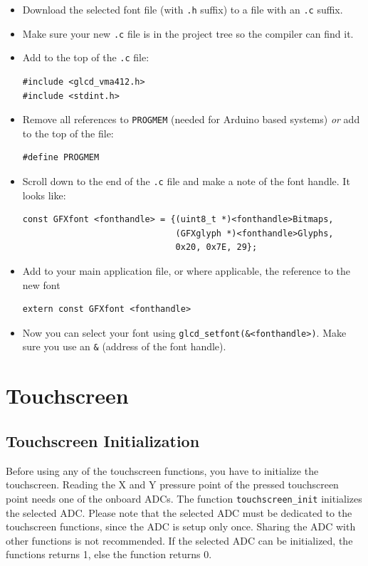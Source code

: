 \documentclass[12pt]{article}
\begin{document}
\begin{itemize}
\item Download the selected font file (with \lstinline|.h| suffix) to a file with an \lstinline|.c| suffix.
\item Make sure your new \lstinline|.c| file is in the project tree so the compiler can find it.
\item Add to the top of the \lstinline|.c| file:
\begin{lstlisting}
#include <glcd_vma412.h>
#include <stdint.h>
\end{lstlisting}
\item Remove all references to \lstinline|PROGMEM| (needed for Arduino based systems) \textsl{or} add to the top of the file:
\begin{lstlisting}
#define PROGMEM
\end{lstlisting}
\item Scroll down to the end of the \lstinline|.c| file and make a note of the font handle. It looks like:
\begin{lstlisting}
const GFXfont <fonthandle> = {(uint8_t *)<fonthandle>Bitmaps,
                              (GFXglyph *)<fonthandle>Glyphs,
                              0x20, 0x7E, 29};
\end{lstlisting}
\item Add to your main application file, or where applicable, the reference to the new font
\begin{lstlisting}
extern const GFXfont <fonthandle>
\end{lstlisting}
\item Now you can select your font using \lstinline|glcd_setfont(&<fonthandle>)|. Make sure you use an \lstinline|&| (address of the font handle).
\end{itemize}


\section{Touchscreen}
\subsection{Touchscreen Initialization}
Before using any of the touchscreen functions, you have to initialize the touchscreen. Reading the X and Y pressure point of the pressed touchscreen point needs one of the onboard ADCs. The function \lstinline|touchscreen_init| initializes the selected ADC. Please note that the selected ADC must be dedicated to the touchscreen functions, since the ADC is setup only once. Sharing the ADC with other functions is not recommended. If the selected ADC can be initialized, the functions returns 1, else the function returns 0.
\end{document}
